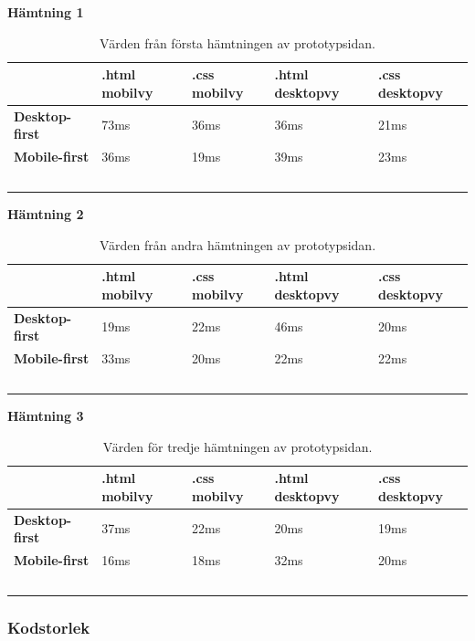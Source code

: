 \documentclass[11pt]{article}
\begin{document}
\newpage
\textbf{Hämtning 1}

\begin{table}[H]
	\centering
	\begin{tabular}{|p{2.5cm}|p{2.7cm}|p{2.4cm}|p{3.1cm}|p{2.8cm}|}
	\hline
	~&\textbf{.html mobilvy}&\textbf{.css mobilvy}&\textbf{.html desktopvy}&\textbf{.css desktopvy}\\ \hline
	\textbf{Desktop-first}&73ms&36ms&36ms&21ms\\ \hline
	\textbf{Mobile-first}&36ms&19ms&39ms&23ms \\ \hline
	~&~&~ &~&~\\ \hline
	\end{tabular}
    \caption {Värden från första hämtningen av prototypsidan.}
\end{table}

\textbf{Hämtning 2}

\begin{table}[H]
	\centering
	\begin{tabular}{|p{2.5cm}|p{2.7cm}|p{2.4cm}|p{3.1cm}|p{2.8cm}|}
	\hline
	~&\textbf{.html mobilvy}&\textbf{.css mobilvy}&\textbf{.html desktopvy}&\textbf{.css desktopvy}\\ \hline
	\textbf{Desktop-first}&19ms&22ms&46ms&20ms\\ \hline
	\textbf{Mobile-first}&33ms&20ms&22ms&22ms \\ \hline
	~&~&~ &~&~\\ \hline
	\end{tabular}
    \caption {Värden från andra hämtningen av prototypsidan.}
\end{table}

\textbf{Hämtning 3}

\begin{table}[H]
	\centering
	\begin{tabular}{|p{2.5cm}|p{2.7cm}|p{2.4cm}|p{3.1cm}|p{2.8cm}|}
	\hline
	~&\textbf{.html mobilvy}&\textbf{.css mobilvy}&\textbf{.html desktopvy}&\textbf{.css desktopvy}\\ \hline
	\textbf{Desktop-first}&37ms&22ms&20ms&19ms\\ \hline
	\textbf{Mobile-first}&16ms&18ms&32ms&20ms \\ \hline
	~&~&~ &~&~\\ \hline
	\end{tabular}
    \caption {Värden för tredje hämtningen av prototypsidan.}
\end{table}


\subsubsection{Kodstorlek}
\end{document}
